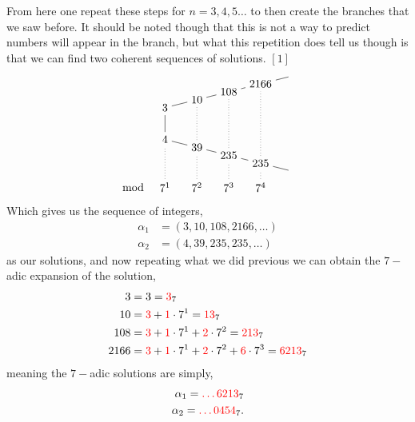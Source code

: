 \documentclass[12pt]{article}
\theoremstyle{definition}
\theoremstyle{remark}
\newcommand{\lrb}[1]{\left[#1\right]}
\newcommand{\tcr}[1]{\textcolor{red}{#1}}
\begin{document}
  From here one repeat these steps for $n = 3,4,5\dots$ to then create the branches that we saw before. It should be noted though that this is not a way to predict numbers will appear in the branch, but what this repetition does tell us though is that we can find two coherent sequences of solutions. $\lrb{1}$ 
  \[ \begin{tikzpicture}
    \node (1) at (0,1) {$ 3$};
    \node (2) at (0,0) {$4$};
    
    \node (4) at (1,1.25) {$10$};
    \node (7) at (2,1.5) {$108$};
    \node (8) at (3, 1.75) {$2166$};
    \node (9) at (4, 2) {};

    \node (5) at (1, -0.25) {$39$};
    \node (23) at (2,-.5) {$235$};
    \node (77) at (3, -.75) {$235$};
    \node  (88) at (4, -1){};

    \draw (4) -- (1) -- (2) -- (5) -- (23) -- (77) -- (88);
    \draw (4) -- (7) -- (8) -- (9);

    \node (z) at (-1, -1.5) {mod};
    \node (a) at (0, -1.5) {$7^{1}$};
    \node (b) at (1, -1.5) {$7^{2}$};
    \node (c) at (2, -1.5) {$7^{3}$};
    \node (d) at (3, -1.5) {$7^{4}$};

    \draw[dotted] (a) -- (2); \draw[dotted] (b) -- (5) -- (4); \draw[dotted] (c) -- (23) -- (7) ; \draw[dotted] (d) -- (77) -- (8);
  \end{tikzpicture}\]
  Which gives us the sequence of integers,
  \begin{align*}
    \alpha_1 &= (3, 10, 108, 2166, \dots) \\
    \alpha_2 &= (4, 39, 235, 235, \dots)
  \end{align*}
  as our solutions, and now repeating what we did previous we can obtain the $7-$adic expansion of the solution,
  \begin{align*}
    3 &= 3 = \tcr{3}_7 \\
    10 &= \tcr{3} + \tcr{1}\cdot 7^{1} = \tcr{13}_7 \\ 
    108 &= \tcr{3} + \tcr{1}\cdot 7^{1} + \tcr{2}\cdot 7^{2} = \tcr{213}_7 \\
    2166 &= \tcr{3} + \tcr{1}\cdot 7^{1} + \tcr{2}\cdot 7^{2} + \tcr{6}\cdot 7^{3}= \tcr{6213}_7
  \end{align*}
  meaning the $7-$adic solutions are simply,
  \begin{align*}
    \alpha_1 = \tcr{\dots 6213}_7 \\
    \alpha_2 = \tcr{\dots 0454}_7.
  \end{align*}
\end{document}
